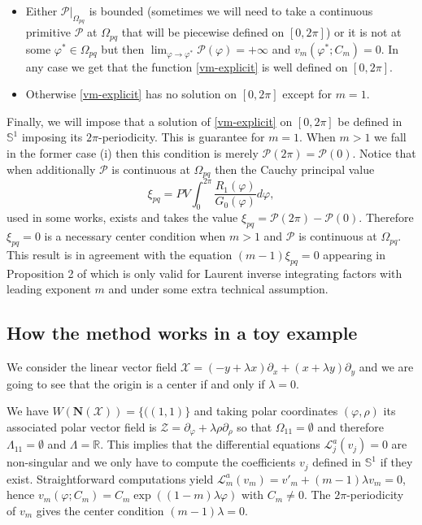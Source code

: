 \documentclass[12pt]{amsart}
\begin{document}
\begin{itemize}
  \item[(i)] Either $\mathcal{P}|_{\Omega_{pq}}$ is bounded (sometimes we will need to take a continuous primitive $\mathcal{P}$ at $\Omega_{pq}$ that will be piecewise defined on $[0, 2 \pi]$) or it is not at some $\varphi^* \in \Omega_{pq}$ but then $\lim_{\varphi \to \varphi^*} \mathcal{P}(\varphi) = + \infty$ and $v_m(\varphi^*; C_m) =0$. In any case we get that the function \eqref{vm-explicit} is well defined on $[0, 2 \pi]$.

  \item[(ii)] Otherwise \eqref{vm-explicit} has no solution on $[0, 2 \pi]$ except for $m=1$.
\end{itemize}

Finally, we will impose that a solution of \eqref{vm-explicit} on $[0, 2 \pi]$ be defined in $\mathbb{S}^1$ imposing its $2\pi$-periodicity. This is guarantee for $m=1$. When $m > 1$ we fall in the former case (i) then this condition is merely $\mathcal{P}(2 \pi) = \mathcal{P}(0)$. Notice that when additionally $\mathcal{P}$ is continuous at $\Omega_{pq}$ then the Cauchy principal value
\begin{equation}\label{xipq}
\xi_{pq} = PV \int_{0}^{2 \pi} \frac{R_1(\varphi)}{G_0(\varphi)} d \varphi,
\end{equation}
used in some works, exists and takes the value $\xi_{pq} =  \mathcal{P}(2 \pi) - \mathcal{P}(0)$. Therefore $\xi_{pq} = 0$ is a necessary center condition when $m >1$ and $\mathcal{P}$ is continuous at $\Omega_{pq}$. This result is in agreement with the equation $(m-1) \xi_{pq} = 0$ appearing in Proposition 2 of \cite{GGR} which is only valid for Laurent inverse integrating factors with leading exponent $m$ and under some extra technical assumption.

\subsection{How the method works in a toy example}

We consider the linear vector field $\mathcal{X} = (-y + \lambda x) \partial_x + (x + \lambda y) \partial_y$ and we are going to see that the origin is a center if and only if $\lambda=0$.

We have $W(\mathbf{N}(\mathcal{X})) = \{ ((1, 1) \}$ and taking polar coordinates $(\varphi, \rho)$ its associated polar vector field is $\mathcal{Z} = \partial_\varphi + \lambda \rho \partial_\rho$ so that $\Omega_{11} = \emptyset$ and therefore $\Lambda_{11} = \emptyset$ and $\Lambda = \mathbb{R}$. This implies that the differential equations $\mathcal{L}^{a}_j(v_j) = 0$ are non-singular and we only have to compute the coefficients $v_j$ defined in $\mathbb{S}^1$ if they exist. Straightforward computations yield $\mathcal{L}^{a}_m(v_m) = v'_m + (m-1) \lambda v_m = 0$, hence $v_m(\varphi; C_m)= C_m \exp((1-m) \lambda \varphi)$ with $C_m \neq 0$. The $2 \pi$-periodicity of $v_m$ gives the center condition $(m-1) \lambda = 0$.
\end{document}
